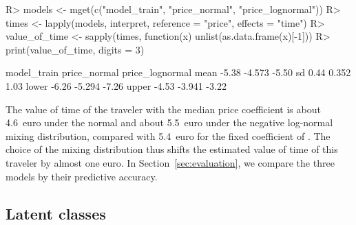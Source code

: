 \documentclass[article,shortnames]{jss}
\begin{document}
%
\begin{Schunk}
\begin{Sinput}
R> models <- mget(c("model_train", "price_normal", "price_lognormal"))
R> times <- lapply(models, interpret, reference = "price", effects = "time")
R> value_of_time <- sapply(times, function(x) unlist(as.data.frame(x)[-1]))
R> print(value_of_time, digits = 3)
\end{Sinput}
\begin{Soutput}
      model_train price_normal price_lognormal
mean        -5.38       -4.573           -5.50
sd           0.44        0.352            1.03
lower       -6.26       -5.294           -7.26
upper       -4.53       -3.941           -3.22
\end{Soutput}
\end{Schunk}
%
The value of time of the traveler with the median price coefficient is about
4.6~euro under
the normal and about
5.5~euro
under the negative log-normal mixing distribution, compared with
5.4~euro for the
fixed coefficient of . The choice of the mixing distribution
thus shifts the estimated value of time of this traveler by almost one euro. In
Section~\ref{sec:evaluation}, we compare the three models by their predictive
accuracy.

\subsection{Latent classes} \label{sec:latent_classes}
\end{document}
